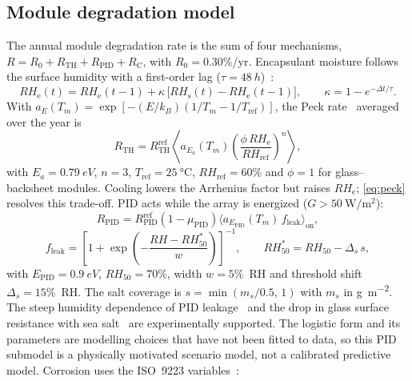 \documentclass[preprint,11pt]{elsarticle}
\newcommand{\RHs}{\mathit{RH}_{\mathrm{s}}}
\newcommand{\RHe}{\mathit{RH}_{\mathrm{e}}}
\begin{document}
\subsection{Module degradation model}
The annual module degradation rate is the sum of four mechanisms, $R = R_0 + R_{\mathrm{TH}} + R_{\mathrm{PID}} +
R_{\mathrm{C}}$, with $R_0=0.30$\%/yr. Encapsulant moisture follows the surface humidity with a first-order lag
($\tau=\SI{48}{h}$)~\cite{kempe2006}:
\begin{equation}
\RHe(t) = \RHe(t-1) + \kappa\,\bigl[\RHs(t)-\RHe(t-1)\bigr],\qquad \kappa = 1-e^{-\Delta t/\tau}.
\label{eq:rhe}
\end{equation}
With $a_E(T_m)=\exp[-(E/k_B)(1/T_m-1/T_{\mathrm{ref}})]$, the Peck rate~\cite{peck1986} averaged over the year is
\begin{equation}
R_{\mathrm{TH}} = R_{\mathrm{TH}}^{\mathrm{ref}}\left\langle a_{E_a}(T_m)
\left(\frac{\phi\,\RHe}{\mathit{RH}_{\mathrm{ref}}}\right)^{n}\right\rangle,
\label{eq:peck}
\end{equation}
with $E_a=\SI{0.79}{eV}$, $n=3$, $T_{\mathrm{ref}}=\SI{25}{\celsius}$, $\mathit{RH}_{\mathrm{ref}}=60\%$ and $\phi=1$
for glass--backsheet modules. Cooling lowers the Arrhenius factor but raises $\RHe$; \eqref{eq:peck} resolves this
trade-off. PID acts while the array is energized ($G>\SI{50}{\watt\per\square\metre}$):
\begin{equation}
R_{\mathrm{PID}} = R_{\mathrm{PID}}^{\mathrm{ref}}(1-\mu_{\mathrm{PID}})
\bigl\langle a_{E_{\mathrm{PID}}}(T_m)\,f_{\mathrm{leak}}\bigr\rangle_{\mathrm{on}},
\label{eq:pid}
\end{equation}
\begin{equation}
f_{\mathrm{leak}} = \left[1+\exp\left(-\frac{\mathit{RH} - \mathit{RH}_{50}^{*}}{w}\right)\right]^{-1},\qquad
\mathit{RH}_{50}^{*} = \mathit{RH}_{50} - \Delta_s\, s,
\label{eq:leak}
\end{equation}
with $E_{\mathrm{PID}}=\SI{0.9}{eV}$, $\mathit{RH}_{50}=70\%$, width $w=5\%$~RH and threshold shift
$\Delta_s=15\%$~RH. The salt coverage is $s=\min(m_s/0.5,\,1)$ with $m_s$ in \si{\gram\per\square\metre}. The steep humidity dependence of PID leakage~\cite{hoffmann2014,luo2017} and the drop in glass
surface resistance with sea salt~\cite{hacke2015,islam2018} are experimentally supported. The logistic form and its
parameters are modelling choices that have not been fitted to data, so this PID submodel is a physically motivated
scenario model, not a calibrated predictive model. Corrosion uses the ISO~9223 variables~\cite{iso9223}:
\end{document}
